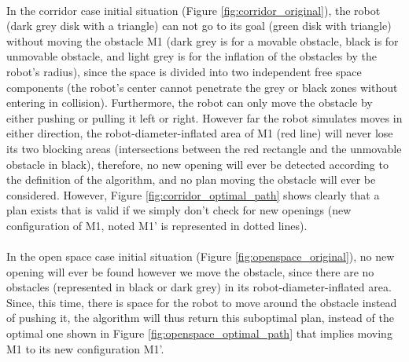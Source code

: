 \paragraph{}\label{figure_legends_paragraph} In the corridor case initial situation (Figure \ref{fig:corridor_original}), the robot (dark grey disk with a triangle) can not go to its goal (green disk with triangle) without moving the obstacle M1 (dark grey is for a movable obstacle, black is for unmovable obstacle, and light grey is for the inflation of the obstacles by the robot's radius), since the space is divided into two independent free space components (the robot's center cannot penetrate the grey or black zones without entering in collision). Furthermore, the robot can only move the obstacle by either pushing or pulling it left or right. However far the robot simulates moves in either direction, the robot-diameter-inflated area of M1 (red line) will never lose its two blocking areas (intersections between the red rectangle and the unmovable obstacle in black), therefore, no new opening will ever be detected according to the definition of the algorithm, and no plan moving the obstacle will ever be considered. However, Figure \ref{fig:corridor_optimal_path} shows clearly that a plan exists that is valid if we simply don't check for new openings (new configuration of M1, noted M1' is represented in dotted lines).

\paragraph{} In the open space case initial situation (Figure \ref{fig:openspace_original}), no new opening will ever be found however we move the obstacle, since there are no obstacles (represented in black or dark grey) in its robot-diameter-inflated area. Since, this time, there is space for the robot to move around the obstacle instead of pushing it, the algorithm will thus return this suboptimal plan, instead of the optimal one shown in Figure \ref{fig:openspace_optimal_path} that implies moving M1 to its new configuration M1'.

